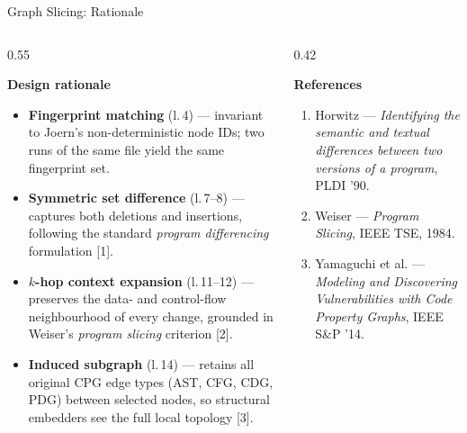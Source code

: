 \documentclass[aspectratio=169,10pt]{beamer}
\begin{document}
\begin{frame}{Graph Slicing: Rationale}
\begin{columns}[T]
\begin{column}{0.55\textwidth}

  \textbf{Design rationale}

  \vspace{0.3em}
  \begin{itemize}\setlength{\itemsep}{4pt}
    \item \textbf{Fingerprint matching} (l.\,4) — invariant to Joern's
          non-deterministic node IDs; two runs of the same file
          yield the same fingerprint set.
    \item \textbf{Symmetric set difference} (l.\,7--8) — captures both
          deletions and insertions, following the standard
          \emph{program differencing} formulation [1].
    \item \textbf{$k$-hop context expansion} (l.\,11--12) — preserves
          the data- and control-flow neighbourhood of every change,
          grounded in Weiser's \emph{program slicing} criterion [2].
    \item \textbf{Induced subgraph} (l.\,14) — retains all original
          CPG edge types (AST, CFG, CDG, PDG) between selected nodes,
          so structural embedders see the full local topology [3].
  \end{itemize}

\end{column}
\begin{column}{0.42\textwidth}

  \textbf{References}

  \vspace{0.3em}
  {\small\color{black!70}
  \begin{enumerate}\setlength{\itemsep}{6pt}
    \item Horwitz — \emph{Identifying the semantic and textual
          differences between two versions of a program}, PLDI '90.
    \item Weiser — \emph{Program Slicing}, IEEE TSE, 1984.
    \item Yamaguchi et al. — \emph{Modeling and Discovering
          Vulnerabilities with Code Property Graphs}, IEEE S\&P '14.
  \end{enumerate}}

\end{column}
\end{columns}
\end{frame}
\end{document}
